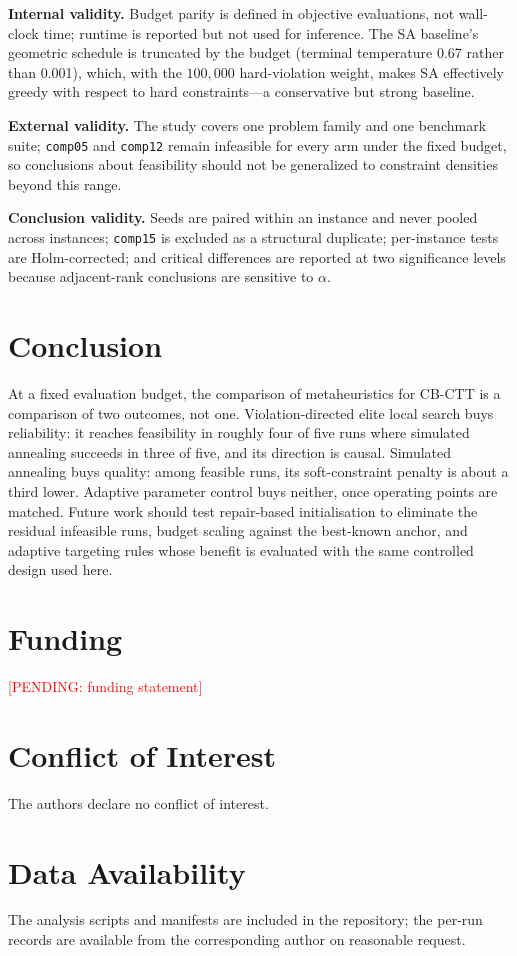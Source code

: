 \documentclass[journal]{IEEEtran}
\newcommand{\pending}[1]{\textcolor{red}{[PENDING: #1]}}
\newcommand{\code}[1]{\texttt{#1}}
\begin{document}
\textbf{Internal validity.} Budget parity is defined in objective evaluations, not wall-clock time; runtime is reported but not used for inference. The SA baseline's geometric schedule is truncated by the budget (terminal temperature 0.67 rather than 0.001), which, with the $100{,}000$ hard-violation weight, makes SA effectively greedy with respect to hard constraints---a conservative but strong baseline.

\textbf{External validity.} The study covers one problem family and one benchmark suite; \code{comp05} and \code{comp12} remain infeasible for every arm under the fixed budget, so conclusions about feasibility should not be generalized to constraint densities beyond this range.

\textbf{Conclusion validity.} Seeds are paired within an instance and never pooled across instances; \code{comp15} is excluded as a structural duplicate; per-instance tests are Holm-corrected; and critical differences are reported at two significance levels because adjacent-rank conclusions are sensitive to $\alpha$.

\section{Conclusion}
At a fixed evaluation budget, the comparison of metaheuristics for CB-CTT is a comparison of two outcomes, not one. Violation-directed elite local search buys reliability: it reaches feasibility in roughly four of five runs where simulated annealing succeeds in three of five, and its direction is causal. Simulated annealing buys quality: among feasible runs, its soft-constraint penalty is about a third lower. Adaptive parameter control buys neither, once operating points are matched. Future work should test repair-based initialisation to eliminate the residual infeasible runs, budget scaling against the best-known anchor, and adaptive targeting rules whose benefit is evaluated with the same controlled design used here.

\section*{Funding}
\pending{funding statement}

\section*{Conflict of Interest}
The authors declare no conflict of interest.

\section*{Data Availability}
The analysis scripts and manifests are included in the repository; the per-run records are available from the corresponding author on reasonable request.



\end{document}
